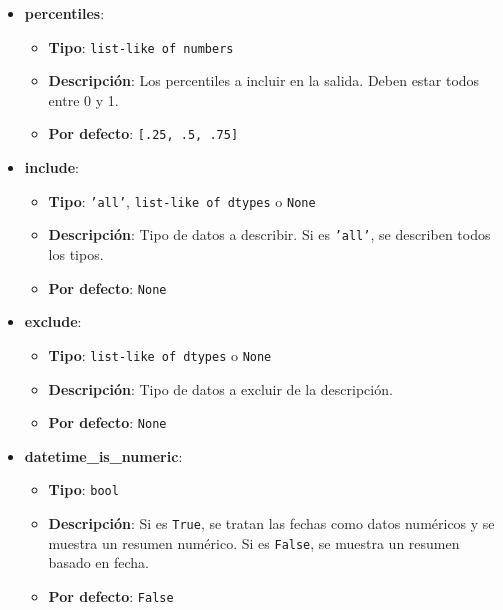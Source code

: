 \begin{itemize}
    \item \textbf{percentiles}:
          \begin{itemize}
              \item \textbf{Tipo}: \texttt{list-like of numbers}
              \item \textbf{Descripción}: Los percentiles a incluir en la
                    salida. Deben estar todos entre 0 y 1.
              \item \textbf{Por defecto}: \texttt{[.25, .5, .75]}
          \end{itemize}

    \item \textbf{include}:
          \begin{itemize}
              \item \textbf{Tipo}: \texttt{'all'}, \texttt{list-like of dtypes}
                    o \texttt{None}
              \item \textbf{Descripción}: Tipo de datos a describir. Si es
                    \texttt{'all'}, se describen todos los tipos.
              \item \textbf{Por defecto}: \texttt{None}
          \end{itemize}

    \item \textbf{exclude}:
          \begin{itemize}
              \item \textbf{Tipo}: \texttt{list-like of dtypes} o \texttt{None}
              \item \textbf{Descripción}: Tipo de datos a excluir de la
                    descripción.
              \item \textbf{Por defecto}: \texttt{None}
          \end{itemize}

    \item \textbf{datetime\_is\_numeric}:
          \begin{itemize}
              \item \textbf{Tipo}: \texttt{bool}
              \item \textbf{Descripción}: Si es \texttt{True}, se tratan las
                    fechas como datos numéricos y se muestra un resumen numérico. Si es
                    \texttt{False}, se muestra un resumen basado en fecha.
              \item \textbf{Por defecto}: \texttt{False}
          \end{itemize}
\end{itemize}

